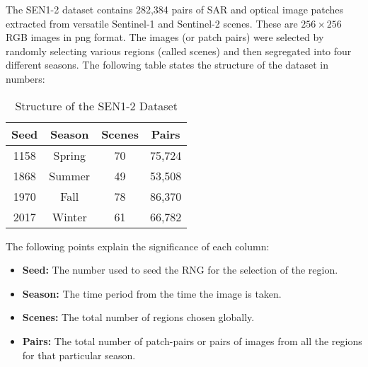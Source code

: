 The SEN1-2 dataset contains 282,384 pairs of SAR and optical image patches extracted from versatile Sentinel-1 and Sentinel-2 scenes. These are $256\times256$ RGB images in png format. The images (or patch pairs) were selected by randomly selecting various regions (called scenes) and then segregated into four different seasons. The following table states the structure of the dataset in numbers:

\begin{table}[h!]
    \begin{center}
        \begin{tabular}{|c|c|c|c|}
            \hline
            Seed & Season & Scenes & Pairs \\
            \hline
            1158 & Spring & 70 & 75,724 \\
            1868 & Summer & 49 & 53,508 \\
            1970 & Fall & 78 & 86,370 \\
            2017 & Winter & 61 & 66,782 \\
            \hline
        \end{tabular}
    \end{center}
    \caption{Structure of the SEN1-2 Dataset}
    \label{table:senStruct}
\end{table}

The following points explain the significance of each column:
\begin{itemize}
    \item \textbf{Seed:} The number used to seed the RNG for the selection of the region.
    \item \textbf{Season:} The time period from the time the image is taken.
    \item \textbf{Scenes:} The total number of regions chosen globally.
    \item \textbf{Pairs:} The total number of patch-pairs or pairs of images from all the regions for that particular season.
\end{itemize}